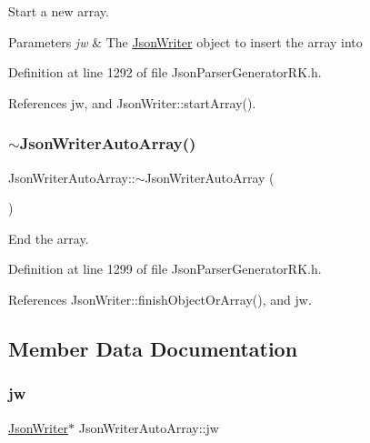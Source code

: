 Start a new array. 


\begin{DoxyParams}{Parameters}
{\em jw} & The \hyperlink{class_json_writer}{Json\+Writer} object to insert the array into \\
\hline
\end{DoxyParams}


Definition at line 1292 of file Json\+Parser\+Generator\+R\+K.\+h.



References jw, and Json\+Writer\+::start\+Array().

\mbox{\label{class_json_writer_auto_array_a2554fc87e46846becf528e878d043bc0}} 
\subsubsection{\texorpdfstring{$\sim$\+Json\+Writer\+Auto\+Array()}{~JsonWriterAutoArray()}}
{\footnotesize\ttfamily Json\+Writer\+Auto\+Array\+::$\sim$\+Json\+Writer\+Auto\+Array (\begin{DoxyParamCaption}{ }\end{DoxyParamCaption})\hspace{0.3cm}{\ttfamily [inline]}}



End the array. 



Definition at line 1299 of file Json\+Parser\+Generator\+R\+K.\+h.



References Json\+Writer\+::finish\+Object\+Or\+Array(), and jw.



\subsection{Member Data Documentation}
\mbox{\label{class_json_writer_auto_array_a747001de80facbc7a782a9e14ad2acae}} 
\subsubsection{\texorpdfstring{jw}{jw}}
{\footnotesize\ttfamily \hyperlink{class_json_writer}{Json\+Writer}$\ast$ Json\+Writer\+Auto\+Array\+::jw\hspace{0.3cm}{\ttfamily [protected]}}



